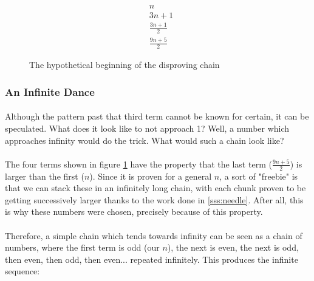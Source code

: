 \documentclass[12pt,letterpaper]{article}
\begin{document}
			\setcounter{equation}{0}
			\begin{figure}[h]
				\begin{align}
					&n\\
					&3n+1\\
					&\frac{3n+1}{2}\\
					&\frac{9n+5}{2}
				\end{align}
				
				\caption{The hypothetical beginning of the disproving chain}
				\label{fig:disproofChainStart}
			\end{figure}
		
		\newpage %
		
		\subsubsection{An Infinite Dance} \label{sss:infinite}
		
			\paragraph{} Although the pattern past that third term cannot be known for certain, it can be speculated. What does it look like to not approach 1? Well, a number which approaches infinity would do the trick. What would such a chain look like?
			
			\paragraph{} The four terms shown in figure \ref{fig:disproofChainStart} have the property that the last term ($\frac{9n+5}{2}$) is larger than the first ($n$). Since it is proven for a general $n$, a sort of "freebie" is that we can stack these in an infinitely long chain, with each chunk proven to be getting successively larger thanks to the work done in \ref{sss:needle}. After all, this is why these numbers were chosen, precisely because of this property.
			
			\paragraph{} Therefore, a simple chain which tends towards infinity can be seen as a chain of numbers, where the first term is odd (our $n$), the next is even, the next is odd, then even, then odd, then even... repeated infinitely. This produces the infinite sequence:
			
\end{document}
